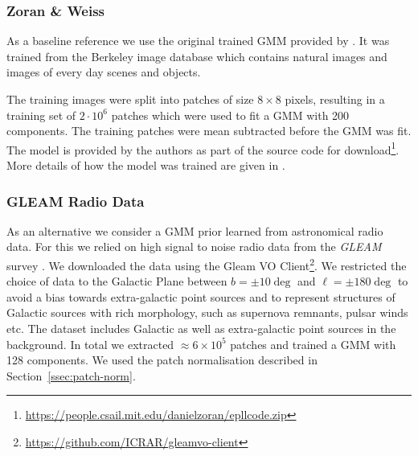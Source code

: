 \documentclass[twocolumn]{aastex631}
\begin{document}
    \subsubsection{Zoran \& Weiss}
    As a baseline reference we use the original trained GMM provided by \cite{Zoran2011}. It was trained from the Berkeley image database \citep{Martin2001} which contains natural images and images of every day scenes and objects. 
    
    The training images were split into patches of size $8\times8$ pixels, resulting in a training set of $2 \cdot 10^{6}$ patches which were used to fit a GMM with 200 components. The training patches were mean subtracted before the GMM was fit. The model is provided by the authors as part of the source code for download\footnote{\url{https://people.csail.mit.edu/danielzoran/epllcode.zip}}. More details of how the model was trained are given in \citet{Zoran2011}.
    
    \subsubsection{GLEAM Radio Data}
    \label{sssec:gleam-radio-data}
    As an alternative we consider a GMM prior learned from astronomical radio data. For this we relied on high signal to noise radio data from the \textit{GLEAM} survey \citep{HurleyWalker2022}. We downloaded the data using the Gleam VO Client\footnote{\url{https://github.com/ICRAR/gleamvo-client}}. We restricted the choice of data to the Galactic Plane between $b=\pm10\deg$ and $\ell = \pm180\deg$ to avoid a bias towards extra-galactic point sources and to represent structures of Galactic sources with rich morphology, such as supernova remnants, pulsar winds etc. The dataset includes Galactic as well as extra-galactic point sources in the background. In total we extracted $\approx 6 \times 10^5$ patches and trained a GMM with 128 components. We used the patch normalisation described in Section~\ref{ssec:patch-norm}.
\end{document}
